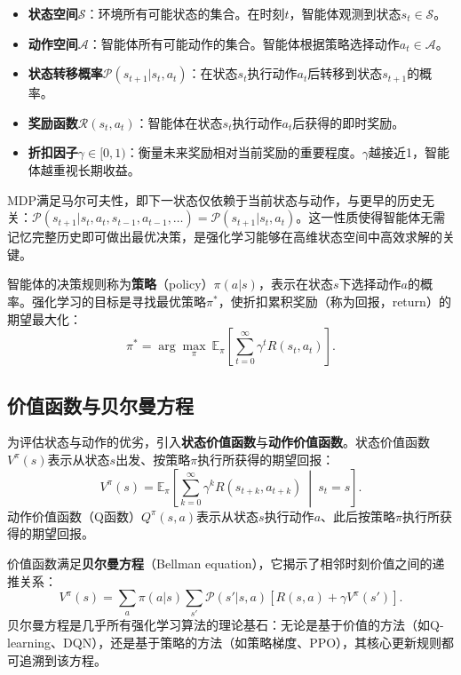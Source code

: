 \documentclass[12pt,a4paper,UTF8]{ctexbook}
\begin{document}
\begin{itemize}
    \item \textbf{状态空间}$\mathcal{S}$：环境所有可能状态的集合。在时刻$t$，智能体观测到状态$s_t\in\mathcal{S}$。
    \item \textbf{动作空间}$\mathcal{A}$：智能体所有可能动作的集合。智能体根据策略选择动作$a_t\in\mathcal{A}$。
    \item \textbf{状态转移概率}$\mathcal{P}(s_{t+1}|s_t,a_t)$：在状态$s_t$执行动作$a_t$后转移到状态$s_{t+1}$的概率。
    \item \textbf{奖励函数}$\mathcal{R}(s_t,a_t)$：智能体在状态$s_t$执行动作$a_t$后获得的即时奖励。
    \item \textbf{折扣因子}$\gamma\in[0,1)$：衡量未来奖励相对当前奖励的重要程度。$\gamma$越接近1，智能体越重视长期收益。
\end{itemize}

MDP满足马尔可夫性，即下一状态仅依赖于当前状态与动作，与更早的历史无关：$\mathcal{P}(s_{t+1}|s_t,a_t,s_{t-1},a_{t-1},\ldots)=\mathcal{P}(s_{t+1}|s_t,a_t)$。这一性质使得智能体无需记忆完整历史即可做出最优决策，是强化学习能够在高维状态空间中高效求解的关键。

智能体的决策规则称为\textbf{策略}（policy）$\pi(a|s)$，表示在状态$s$下选择动作$a$的概率。强化学习的目标是寻找最优策略$\pi^*$，使折扣累积奖励（称为回报，return）的期望最大化：
\begin{equation}
    \pi^* = \arg\max_{\pi}\ \mathbb{E}_{\pi}\left[\sum_{t=0}^{\infty}\gamma^t R(s_t,a_t)\right].
    \label{eq:mdp_objective}
\end{equation}

\subsection{价值函数与贝尔曼方程}

为评估状态与动作的优劣，引入\textbf{状态价值函数}与\textbf{动作价值函数}。状态价值函数$V^\pi(s)$表示从状态$s$出发、按策略$\pi$执行所获得的期望回报：
\begin{equation}
    V^\pi(s) = \mathbb{E}_{\pi}\left[\sum_{k=0}^{\infty}\gamma^k R(s_{t+k},a_{t+k})\ \middle|\ s_t=s\right].
    \label{eq:state_value}
\end{equation}
动作价值函数（Q函数）$Q^\pi(s,a)$表示从状态$s$执行动作$a$、此后按策略$\pi$执行所获得的期望回报。

价值函数满足\textbf{贝尔曼方程}（Bellman equation），它揭示了相邻时刻价值之间的递推关系：
\begin{equation}
    V^\pi(s) = \sum_{a}\pi(a|s)\sum_{s'} \mathcal{P}(s'|s,a)\left[R(s,a)+\gamma V^\pi(s')\right].
    \label{eq:bellman}
\end{equation}
贝尔曼方程是几乎所有强化学习算法的理论基石：无论是基于价值的方法（如Q-learning、DQN），还是基于策略的方法（如策略梯度、PPO），其核心更新规则都可追溯到该方程。
\end{document}
